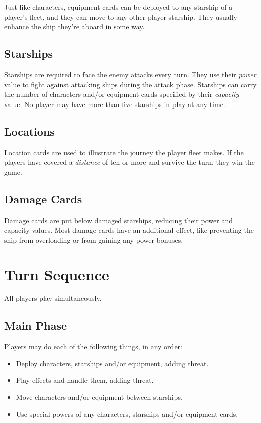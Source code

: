 \documentclass[11pt, a4paper]{article}
\begin{document}
Just like characters, equipment cards can be deployed to any starship of a
player's fleet, and they can move to any other player starship. They usually
enhance the ship they're aboard in some way.

\subsection{Starships}

Starships are required to face the enemy attacks every turn. They use their
\emph{power} value to fight against attacking ships during the attack phase.
Starships can carry the number of characters and/or equipment cards specified by
their \emph{capacity} value. No player may have more than five starships in play
at any time.

\subsection{Locations}

Location cards are used to illustrate the journey the player fleet makes. If
the players have covered a \emph{distance} of ten or more and survive the turn,
they win the game.

\subsection{Damage Cards}

Damage cards are put below damaged starships, reducing their power and capacity
values. Most damage cards have an additional effect, like preventing the ship
from overloading or from gaining any power bonuses.

\section{Turn Sequence}

All players play simultaneously.

\subsection{Main Phase}

Players may do each of the following things, in any order:

\begin{itemize}
 \item Deploy characters, starships and/or equipment, adding threat.
 \item Play effects and handle them, adding threat.
 \item Move characters and/or equipment between starships.
 \item Use special powers of any characters, starships and/or equipment cards.
\end{itemize}
\end{document}
